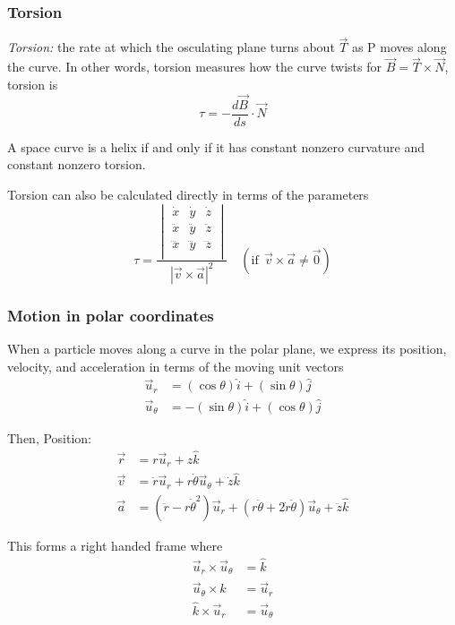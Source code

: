 \documentclass[12pt]{article}
\begin{document}
\subsubsection{Torsion}
\emph{Torsion:} the rate at which the osculating plane turns about $\vec{T}$ as P moves along the curve. In other words, torsion measures how the curve twists
for $\vec{B} = \vec{T} \times \vec{N}$, torsion is 
\[\tau = -\frac{d\vec{B}}{ds} \cdot \vec{N}\]

A space curve is a helix if and only if it has constant nonzero curvature and constant nonzero torsion.

Torsion can also be calculated directly in terms of the parameters
\[\tau = \frac{\begin{vmatrix}
    \dot{x} & \dot{y} & \dot{z}\\
    \ddot{x} & \ddot{y} & \ddot{z}\\
    \dddot{x} & \dddot{y} & \dddot{z}\\
\end{vmatrix}}{|\vec{v} \times \vec{a}|^2} \quad (\text{if}\;\,\vec{v} \times \vec{a} \neq \vec{0})\]

\subsubsection{Motion in polar coordinates}
When a particle moves along a curve in the polar plane, we express its position, velocity, and acceleration in terms of the moving unit vectors
\begin{align*}
    \vec{u}_r &= (\cos \theta) \hat{i} + (\sin \theta) \hat{j}\\
    \vec{u}_\theta &= -(\sin \theta)\hat{i} + (\cos \theta) \hat{j}
\end{align*}

Then,
Position:
\begin{align*}
    \vec{r} &= r \vec{u}_r + z \hat{k}\\
    \vec{v} &= \dot{r} \vec{u}_r + r \dot{\theta} \vec{u}_\theta + \dot{z} \hat{k}\\
    \vec{a} &= (\ddot{r} - r \dot{\theta}^2) \vec{u}_r + (r\ddot{\theta} + 2\dot{r} \ddot{\theta}) \vec{u}_\theta + \ddot{z} \hat{k}
\end{align*}

This forms a right handed frame where
\begin{align*}
    \vec{u}_r \times \vec{u}_\theta &= \hat{k}\\
    \vec{u}_\theta \times \hat{k} &= \vec{u}_r\\
    \hat{k} \times \vec{u}_r &= \vec{u}_\theta
\end{align*}
\end{document}
